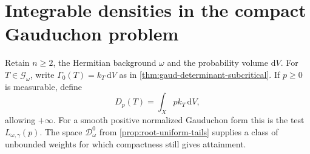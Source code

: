 \section{Integrable densities in the compact Gauduchon problem}
\label{sec:integrable-gauduchon-currents}

Retain $n\geq2$, the Hermitian background $\omega$ and the probability volume $\mathrm{d}V$. For $T\in\mathscr G_\omega$, write $\Gamma_0(T)=k_T\,\mathrm{d}V$ as in \cref{thm:gaud-determinant-subcritical}. If $p\geq0$ is measurable, define
\[
 D_p(T)=\int_Xp k_T\,\mathrm{d}V,
\]
allowing $+\infty$. For a smooth positive normalized Gauduchon form this is the test $L_{\omega,\gamma}(p)$. The space $\mathcal D_\omega^0$ from \cref{prop:root-uniform-tails} supplies a class of unbounded weights for which compactness still gives attainment.

